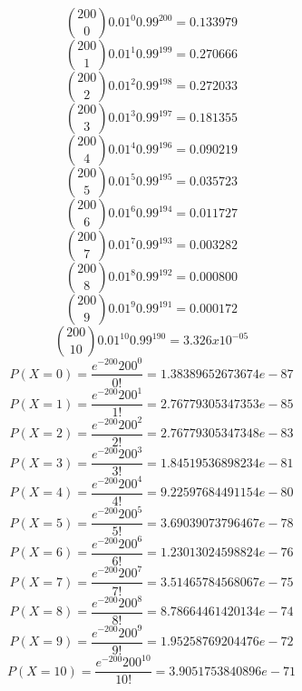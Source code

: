$${200 \choose 0}0.01^{0}0.99^{200}=0.133979$$
$${200 \choose 1}0.01^{1}0.99^{199}=0.270666$$
$${200 \choose 2}0.01^{2}0.99^{198}=0.272033$$
$${200 \choose 3}0.01^{3}0.99^{197}=0.181355$$
$${200 \choose 4}0.01^{4}0.99^{196}=0.090219$$
$${200 \choose 5}0.01^{5}0.99^{195}=0.035723$$
$${200 \choose 6}0.01^{6}0.99^{194}=0.011727$$
$${200 \choose 7}0.01^{7}0.99^{193}=0.003282$$
$${200 \choose 8}0.01^{8}0.99^{192}=0.000800$$
$${200 \choose 9}0.01^{9}0.99^{191}=0.000172$$
$${200 \choose 10}0.01^{10}0.99^{190}=3.326x10^{-05}$$
$$P(X=0)=\frac{e^{-200}200^{0}}{0!}=1.38389652673674e-87$$
$$P(X=1)=\frac{e^{-200}200^{1}}{1!}=2.76779305347353e-85$$
$$P(X=2)=\frac{e^{-200}200^{2}}{2!}=2.76779305347348e-83$$
$$P(X=3)=\frac{e^{-200}200^{3}}{3!}=1.84519536898234e-81$$
$$P(X=4)=\frac{e^{-200}200^{4}}{4!}=9.22597684491154e-80$$
$$P(X=5)=\frac{e^{-200}200^{5}}{5!}=3.69039073796467e-78$$
$$P(X=6)=\frac{e^{-200}200^{6}}{6!}=1.23013024598824e-76$$
$$P(X=7)=\frac{e^{-200}200^{7}}{7!}=3.51465784568067e-75$$
$$P(X=8)=\frac{e^{-200}200^{8}}{8!}=8.78664461420134e-74$$
$$P(X=9)=\frac{e^{-200}200^{9}}{9!}=1.95258769204476e-72$$
$$P(X=10)=\frac{e^{-200}200^{10}}{10!}=3.9051753840896e-71$$
